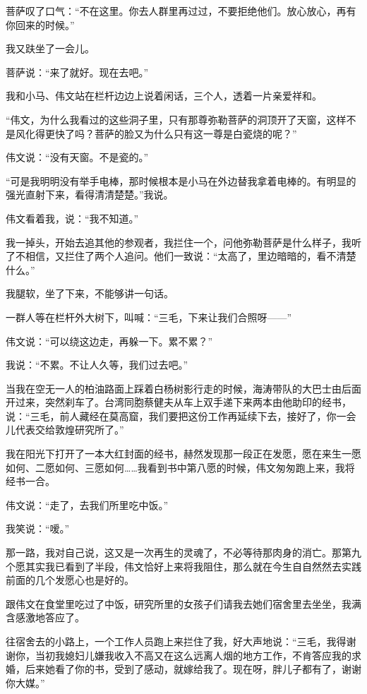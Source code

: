 \par 菩萨叹了口气：“不在这里。你去人群里再过过，不要拒绝他们。放心放心，再有你回来的时候。”
\par 我又趺坐了一会儿。
\par 菩萨说：“来了就好。现在去吧。”
\par 
\par 我和小马、伟文站在栏杆边边上说着闲话，三个人，透着一片亲爱祥和。
\par “伟文，为什么我看过的这些洞子里，只有那尊弥勒菩萨的洞顶开了天窗，这样不是风化得更快了吗？菩萨的脸又为什么只有这一尊是白瓷烧的呢？”
\par 伟文说：“没有天窗。不是瓷的。”
\par “可是我明明没有举手电棒，那时候根本是小马在外边替我拿着电棒的。有明显的强光直射下来，看得清清楚楚。”我说。
\par 伟文看着我，说：“我不知道。”
\par 我一掉头，开始去追其他的参观者，我拦住一个，问他弥勒菩萨是什么样子，我听了不相信，又拦住了两个人追问。他们一致说：“太高了，里边暗暗的，看不清楚什么。”
\par 我腿软，坐了下来，不能够讲一句话。
\par 一群人等在栏杆外大树下，叫喊：“三毛，下来让我们合照呀——”
\par 伟文说：“可以绕这边走，再躲一下。累不累？”
\par 我说：“不累。不让人久等，我们过去吧。”
\par 当我在空无一人的柏油路面上踩着白杨树影行走的时候，海涛带队的大巴士由后面开过来，突然刹车了。台湾同胞蔡健夫从车上双手递下来两本由他助印的经书，说：“三毛，前人藏经在莫高窟，我们要把这份工作再延续下去，接好了，你一会儿代表交给敦煌研究所了。”
\par 我在阳光下打开了一本大红封面的经书，赫然发现那一段正在发愿，愿在来生一愿如何、二愿如何、三愿如何……我看到书中第八愿的时候，伟文匆匆跑上来，我将经书一合。
\par 伟文说：“走了，去我们所里吃中饭。”
\par 我笑说：“嗳。”
\par 那一路，我对自己说，这又是一次再生的灵魂了，不必等待那肉身的消亡。那第九个愿其实我已看到了半段，伟文恰好上来将我阻住，那么就在今生自自然然去实践前面的几个发愿心也是好的。
\par 跟伟文在食堂里吃过了中饭，研究所里的女孩子们请我去她们宿舍里去坐坐，我满含感激地答应了。
\par 往宿舍去的小路上，一个工作人员跑上来拦住了我，好大声地说：“三毛，我得谢谢你，当初我媳妇儿嫌我收入不高又在这么远离人烟的地方工作，不肯答应我的求婚，后来她看了你的书，受到了感动，就嫁给我了。现在呀，胖儿子都有了，谢谢你大媒。”
